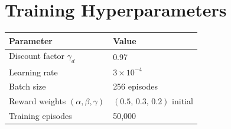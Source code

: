\chapter{Training Hyperparameters}

\begin{center}
\begin{tabularx}{0.75\textwidth}{@{}l X@{}}
\toprule
\textbf{Parameter} & \textbf{Value} \\
\midrule
Discount factor $\gamma_d$      & 0.97 \\
Learning rate                   & $3 \times 10^{-4}$ \\
Batch size                      & 256 episodes \\
Reward weights $(\alpha,\beta,\gamma)$ & $(0.5,\,0.3,\,0.2)$ initial \\
Training episodes               & 50{,}000 \\
\bottomrule
\end{tabularx}
\end{center}

